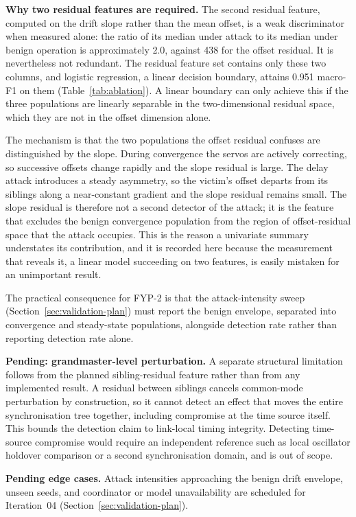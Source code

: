 \textbf{Why two residual features are required.} The second residual feature,
computed on the drift slope rather than the mean offset, is a weak discriminator when
measured alone: the ratio of its median under attack to its median under benign
operation is approximately 2.0, against 438 for the offset residual. It is nevertheless
not redundant. The residual feature set contains only these two columns, and logistic
regression, a linear decision boundary, attains 0.951 macro-F1 on them
(Table~\ref{tab:ablation}). A linear boundary can only achieve this if the three
populations are linearly separable in the two-dimensional residual space, which they
are not in the offset dimension alone.

The mechanism is that the two populations the offset residual confuses are distinguished
by the slope. During convergence the servos are actively correcting, so successive
offsets change rapidly and the slope residual is large. The delay attack introduces a
steady asymmetry, so the victim's offset departs from its siblings along a near-constant
gradient and the slope residual remains small. The slope residual is therefore not a
second detector of the attack; it is the feature that excludes the benign convergence
population from the region of offset-residual space that the attack occupies. This is
the reason a univariate summary understates its contribution, and it is recorded here
because the measurement that reveals it, a linear model succeeding on two features,
is easily mistaken for an unimportant result.

The practical consequence for FYP-2 is that the attack-intensity sweep (Section~\ref{sec:validation-plan})
must report the benign envelope, separated into convergence and steady-state
populations, alongside detection rate rather than reporting detection rate alone.

\textbf{Pending: grandmaster-level perturbation.} A separate structural limitation
follows from the planned sibling-residual feature rather than from any implemented
result. A residual between siblings cancels common-mode perturbation by construction,
so it cannot detect an effect that moves the entire synchronisation tree together,
including compromise at the time source itself. This bounds the detection claim to
link-local timing integrity. Detecting time-source compromise would require an
independent reference such as local oscillator holdover comparison or a second
synchronisation domain, and is out of scope.

\textbf{Pending edge cases.} Attack intensities approaching the benign drift envelope,
unseen seeds, and coordinator or model unavailability are scheduled for Iteration~04
(Section~\ref{sec:validation-plan}).


